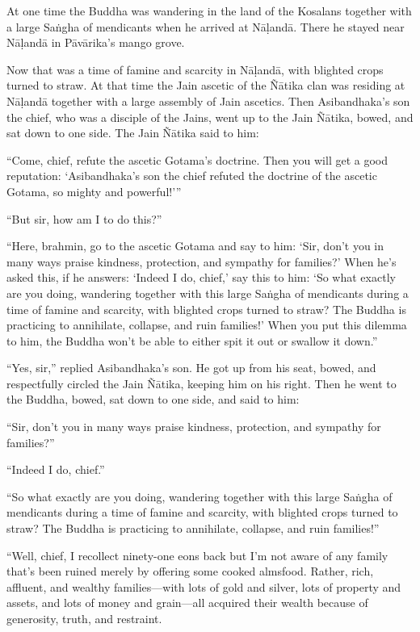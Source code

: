 \documentclass[12pt,openany]{book}%
\begin{document}
At one time the Buddha was wandering in the land of the Kosalans together with a large \textsanskrit{Saṅgha} of mendicants when he arrived at \textsanskrit{Nāḷandā}. There he stayed near \textsanskrit{Nāḷandā} in \textsanskrit{Pāvārika}’s mango grove. 

Now that was a time of famine and scarcity in \textsanskrit{Nāḷandā}, with blighted crops turned to straw. At that time the Jain ascetic of the \textsanskrit{Ñātika} clan was residing at \textsanskrit{Nāḷandā} together with a large assembly of Jain ascetics. Then Asibandhaka’s son the chief, who was a disciple of the Jains, went up to the Jain \textsanskrit{Ñātika}, bowed, and sat down to one side. The Jain \textsanskrit{Ñātika} said to him: 

“Come, chief, refute the ascetic Gotama’s doctrine. Then you will get a good reputation: ‘Asibandhaka’s son the chief refuted the doctrine of the ascetic Gotama, so mighty and powerful!’” 

“But sir, how am I to do this?” 

“Here, brahmin, go to the ascetic Gotama and say to him: ‘Sir, don’t you in many ways praise kindness, protection, and sympathy for families?’ When he’s asked this, if he answers: ‘Indeed I do, chief,’ say this to him: ‘So what exactly are you doing, wandering together with this large \textsanskrit{Saṅgha} of mendicants during a time of famine and scarcity, with blighted crops turned to straw? The Buddha is practicing to annihilate, collapse, and ruin families!’ When you put this dilemma to him, the Buddha won’t be able to either spit it out or swallow it down.” 

“Yes, sir,” replied Asibandhaka’s son. He got up from his seat, bowed, and respectfully circled the Jain \textsanskrit{Ñātika}, keeping him on his right. Then he went to the Buddha, bowed, sat down to one side, and said to him: 

“Sir, don’t you in many ways praise kindness, protection, and sympathy for families?” 

“Indeed I do, chief.” 

“So what exactly are you doing, wandering together with this large \textsanskrit{Saṅgha} of mendicants during a time of famine and scarcity, with blighted crops turned to straw? The Buddha is practicing to annihilate, collapse, and ruin families!” 

“Well, chief, I recollect ninety-one eons back but I’m not aware of any family that’s been ruined merely by offering some cooked almsfood. Rather, rich, affluent, and wealthy families—with lots of gold and silver, lots of property and assets, and lots of money and grain—all acquired their wealth because of generosity, truth, and restraint. 
\end{document}
